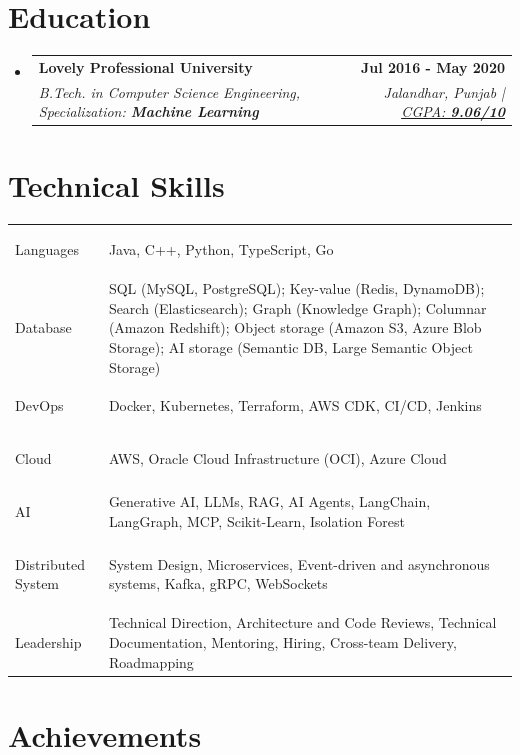 \documentclass[10pt,a4paper]{article}
\makeatletter
\newcommand{\resumeSubheading}[4]{
  \item
  \begin{tabular*}{1.0\textwidth}[t]{l@{\extracolsep{\fill}}r}
    \textbf{#1} & \textbf{\small #2} \\
    \textit{\small #3} & \textit{\small #4} \\
  \end{tabular*}\vspace{-2pt}
}
\newcommand{\resumeSubHeadingListStart}{\begin{itemize}[leftmargin=0in,label={},itemsep=5pt,topsep=2pt,parsep=0pt]}
\newcommand{\resumeSubHeadingListEnd}{\end{itemize}}
\newcommand{\resumeHref}[2]{\href{#1}{\uline{#2}}}
\makeatother
\begin{document}
\newpage

\section{Education}
\resumeSubHeadingListStart
  \resumeSubheading
    {Lovely Professional University}{Jul 2016 - May 2020}
    {B.Tech. in Computer Science Engineering, Specialization: \textbf{Machine Learning}}{Jalandhar, Punjab | \resumeHref{https://drive.google.com/file/d/1n-Xg5Bm-tyqGOUC7onOlteQrPqXydC8Z/view}{CGPA: \textbf{9.06/10}}}
\resumeSubHeadingListEnd

\section{Technical Skills}
\begin{tabularx}{\textwidth}{@{}>{\small\bfseries\raggedright\arraybackslash}p{}@{\hspace{0.02\textwidth}}>{\fontsize{8.7pt}{10.4pt}\selectfont\raggedright\arraybackslash}X@{}}
Languages & Java, C++, Python, TypeScript, Go \\[3pt]
Database & SQL (MySQL, PostgreSQL); Key-value (Redis, DynamoDB); Search (Elasticsearch); Graph (Knowledge Graph); Columnar (Amazon Redshift); Object storage (Amazon S3, Azure Blob Storage); AI storage (Semantic DB, Large Semantic Object Storage) \\[3pt]
DevOps & Docker, Kubernetes, Terraform, AWS CDK, CI/CD, Jenkins \\[3pt]
Cloud & AWS, Oracle Cloud Infrastructure (OCI), Azure Cloud \\[3pt]
AI & Generative AI, LLMs, RAG, AI Agents, LangChain, LangGraph, MCP, Scikit-Learn, Isolation Forest \\[3pt]
Distributed System & System Design, Microservices, Event-driven and asynchronous systems, Kafka, gRPC, WebSockets \\[3pt]
Leadership & Technical Direction, Architecture and Code Reviews, Technical Documentation, Mentoring, Hiring, Cross-team Delivery, Roadmapping
\end{tabularx}
\vspace{1pt}

\section{Achievements}
\end{document}
